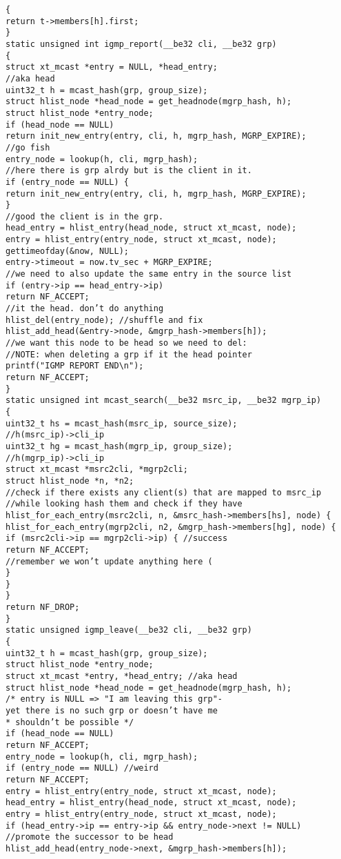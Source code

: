 \begin{verbatim}
{
return t->members[h].first;
}
static unsigned int igmp_report(__be32 cli, __be32 grp)
{
struct xt_mcast *entry = NULL, *head_entry;
//aka head
uint32_t h = mcast_hash(grp, group_size);
struct hlist_node *head_node = get_headnode(mgrp_hash, h);
struct hlist_node *entry_node;
if (head_node == NULL)
return init_new_entry(entry, cli, h, mgrp_hash, MGRP_EXPIRE);
//go fish
entry_node = lookup(h, cli, mgrp_hash);
//here there is grp alrdy but is the client in it.
if (entry_node == NULL) {
return init_new_entry(entry, cli, h, mgrp_hash, MGRP_EXPIRE);
}
//good the client is in the grp.
head_entry = hlist_entry(head_node, struct xt_mcast, node);
entry = hlist_entry(entry_node, struct xt_mcast, node);
gettimeofday(&now, NULL);
entry->timeout = now.tv_sec + MGRP_EXPIRE;
//we need to also update the same entry in the source list
if (entry->ip == head_entry->ip)
return NF_ACCEPT;
//it the head. don’t do anything
hlist_del(entry_node); //shuffle and fix
hlist_add_head(&entry->node, &mgrp_hash->members[h]);
//we want this node to be head so we need to del:
//NOTE: when deleting a grp if it the head pointer
printf("IGMP REPORT END\n");
return NF_ACCEPT;
}
static unsigned int mcast_search(__be32 msrc_ip, __be32 mgrp_ip)
{
uint32_t hs = mcast_hash(msrc_ip, source_size);
//h(msrc_ip)->cli_ip
uint32_t hg = mcast_hash(mgrp_ip, group_size);
//h(mgrp_ip)->cli_ip
struct xt_mcast *msrc2cli, *mgrp2cli;
struct hlist_node *n, *n2;
//check if there exists any client(s) that are mapped to msrc_ip
//while looking hash them and check if they have
hlist_for_each_entry(msrc2cli, n, &msrc_hash->members[hs], node) {
hlist_for_each_entry(mgrp2cli, n2, &mgrp_hash->members[hg], node) {
if (msrc2cli->ip == mgrp2cli->ip) { //success
return NF_ACCEPT;
//remember we won’t update anything here (
}
}
}
return NF_DROP;
}
static unsigned igmp_leave(__be32 cli, __be32 grp)
{
uint32_t h = mcast_hash(grp, group_size);
struct hlist_node *entry_node;
struct xt_mcast *entry, *head_entry; //aka head
struct hlist_node *head_node = get_headnode(mgrp_hash, h);
/* entry is NULL => "I am leaving this grp"-
yet there is no such grp or doesn’t have me
* shouldn’t be possible */
if (head_node == NULL)
return NF_ACCEPT;
entry_node = lookup(h, cli, mgrp_hash);
if (entry_node == NULL) //weird
return NF_ACCEPT;
entry = hlist_entry(entry_node, struct xt_mcast, node);
head_entry = hlist_entry(head_node, struct xt_mcast, node);
entry = hlist_entry(entry_node, struct xt_mcast, node);
if (head_entry->ip == entry->ip && entry_node->next != NULL)
//promote the successor to be head
hlist_add_head(entry_node->next, &mgrp_hash->members[h]);

\end{verbatim}
